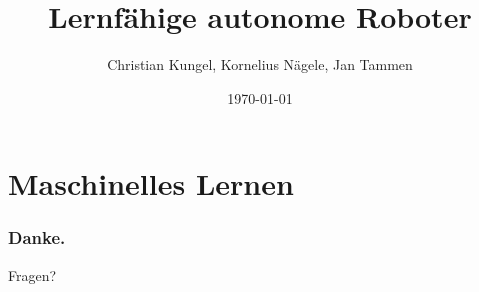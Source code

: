 \documentclass{beamer}
\title[ROBO WS 06/07]{Lernfähige autonome Roboter}
\author[Kungel, Nägele, Tammen]{Christian Kungel, Kornelius Nägele, Jan Tammen}
\institute{
  Seminar Robotik WS 06/07\\
  Fakultät Informatik,\\
  HTWG Konstanz
}
\date{\today}
\begin{document}
\begin{frame}
  \titlepage
\end{frame}




\section{Maschinelles Lernen}












\begin{frame}
  \frametitle{Danke.}
  Fragen?
\end{frame}
\end{document}
